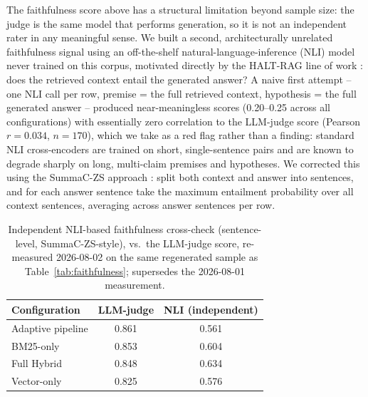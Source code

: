 \documentclass[a4paper,twoside]{article}
\begin{document}
The faithfulness score above has a structural limitation beyond sample size: the judge is the same model that performs generation, so it is not an independent rater in any meaningful sense. We built a second, architecturally unrelated faithfulness signal using an off-the-shelf natural-language-inference (NLI) model never trained on this corpus, motivated directly by the HALT-RAG line of work \citep{halt2025}: does the retrieved context entail the generated answer? A naive first attempt -- one NLI call per row, premise = the full retrieved context, hypothesis = the full generated answer -- produced near-meaningless scores (0.20--0.25 across all configurations) with essentially zero correlation to the LLM-judge score (Pearson $r=0.034$, $n=170$), which we take as a red flag rather than a finding: standard NLI cross-encoders are trained on short, single-sentence pairs and are known to degrade sharply on long, multi-claim premises and hypotheses. We corrected this using the SummaC-ZS approach \citep{summac2022}: split both context and answer into sentences, and for each answer sentence take the maximum entailment probability over all context sentences, averaging across answer sentences per row.

\begin{table}[t]
\caption{Independent NLI-based faithfulness cross-check (sentence-level, SummaC-ZS-style), vs.\ the LLM-judge score, re-measured 2026-08-02 on the same regenerated sample as Table~\ref{tab:faithfulness}; supersedes the 2026-08-01 measurement.}\label{tab:nli-faithfulness} \centering
\begin{tabular}{|l|c|c|}
\hline
Configuration & LLM-judge & NLI (independent) \\
\hline
Adaptive pipeline & 0.861 & 0.561 \\
BM25-only & 0.853 & 0.604 \\
Full Hybrid & 0.848 & 0.634 \\
Vector-only & 0.825 & 0.576 \\
\hline
\end{tabular}
\end{table}
\end{document}
